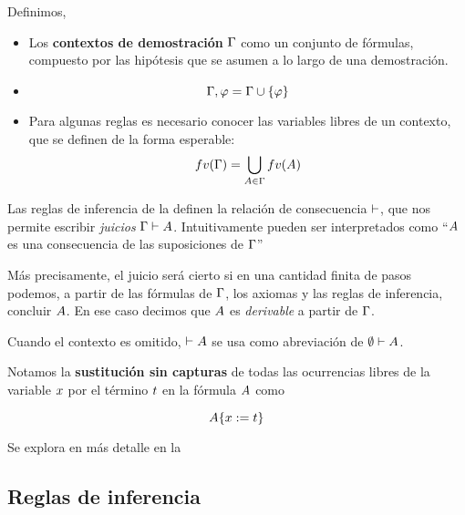 \begin{definition}
    Definimos,
    \begin{itemize}
        \item Los \textbf{contextos de demostración} $\Gamma$ como un conjunto de fórmulas, compuesto por las hipótesis que se asumen a lo largo de una demostración.
        \item {}
        \[
            \Gamma, \varphi = \Gamma \cup \{\varphi\}
        \]
        \item Para algunas reglas es necesario conocer las variables libres de un contexto, que se definen de la forma esperable:
        \[
            fv(\Gamma) = \bigcup_{A \in \Gamma} fv(A)
        \]
    \end{itemize}
\end{definition}

\begin{definition}
    Las reglas de inferencia de la  definen la relación de consecuencia $\vdash$, que nos permite escribir \textit{juicios} $\Gamma \vdash A$. Intuitivamente pueden ser interpretados como ``$A$ es una consecuencia de las suposiciones de $\Gamma$''

    Más precisamente, el juicio será cierto si en una cantidad finita de pasos
    podemos, a partir de las fórmulas de $\Gamma$, los axiomas y las reglas de
    inferencia, concluir $A$. En ese caso decimos que $A$ es
    \textit{derivable} a partir de $\Gamma$.
    
    Cuando el contexto es omitido, $\vdash A$ se usa como abreviación de
    $\emptyset \vdash A$.
\end{definition}

\begin{definition}[Sustitución]
    Notamos la \textbf{sustitución sin capturas} de todas las ocurrencias libres de la variable $x$ por el término $t$ en la fórmula $A$ como

    \[
        A \{x := t\}
    \]

    Se explora en más detalle en la 
\end{definition}

\subsection{Reglas de inferencia}

